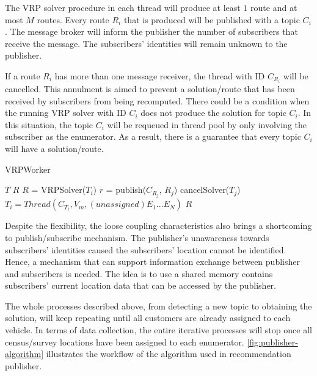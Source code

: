 \documentclass[conference]{IEEEtran}
\begin{document}
The VRP solver procedure in each thread will produce at least $1$ route and at most $M$ routes. Every route $R_i$ that is produced will be published with a topic $C_i$. The message broker will inform the publisher the number of subscribers that receive the message. The subscribers' identities will remain unknown to the publisher. 


If a route $R_i$ has more than one message receiver, the thread with ID $C_{R_i}$ will be cancelled. This annulment is aimed to prevent a solution/route that has been received by subscribers from being recomputed. There could be a condition when the running VRP solver with ID $C_i$ does not produce the solution for topic $C_i$. In this situation, the topic $C_i$ will be requeued in thread pool by only involving the subscriber as the enumerator. As a result, there is a guarantee that every topic $C_i$ will have a solution/route. 


\begin{algorithm}[!]
	\caption{VRPWorker}
	\label{alg:vrp-worker}
	\begin{algorithmic}[1]
		\renewcommand{\algorithmicrequire}{\textbf{Input:}}
		\renewcommand{\algorithmicensure}{\textbf{Output:}}
		\REQUIRE $T$
		\ENSURE  $R$
			\STATE $R$ = VRPSolver($T_i$)
				\STATE $r$ = publish($C_{R_j}$, $R_j$)
					\STATE cancelSolver($T_j$)
					\STATE $T_i = Thread(C_{T_i}, V_m, (unassigned) E_1...E_N)$
				\ENDIF
			\ENDFOR
		\ENDFOR
		\RETURN $R$
	\end{algorithmic}
\end{algorithm}


Despite the flexibility, the loose coupling characteristics also brings a shortcoming to publish/subscribe mechanism. The publisher's unawareness towards subscribers' identities caused the subscribers' location cannot be identified. Hence, a mechanism that can support information exchange between publisher and subscribers is needed. The idea is to use a shared memory contains subscribers' current location data that can be accessed by the publisher. 

The whole processes described above, from detecting a new topic to obtaining the solution, will keep repeating until all customers are already assigned to each vehicle. In terms of data collection, the entire iterative processes will stop once all census/survey locations have been assigned to each enumerator. \autoref{fig:publisher-algorithm} illustrates the workflow of the algorithm used in recommendation publisher.
\end{document}
